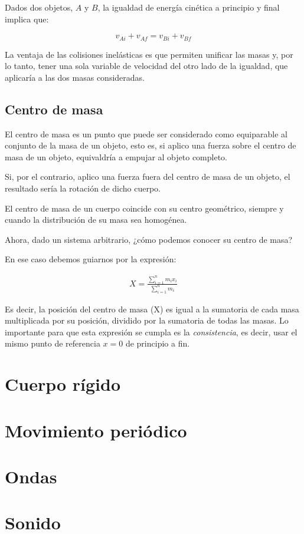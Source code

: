 \documentclass[12pt]{article}
\begin{document}
Dados dos objetos, \(A\) y \(B\), 
la igualdad de energía cinética a principio y final implica que:

\begin{equation}
	v_{Ai} + v_{Af} = v_{Bi} + v_{Bf}
\end{equation}

La ventaja de las colisiones inelásticas es que permiten unificar las masas y,
por lo tanto, tener una sola variable de velocidad del otro lado de la igualdad,
que aplicaría a las dos masas consideradas.

\subsection{Centro de masa}

El centro de masa es un punto que puede ser considerado como equiparable al 
conjunto de la masa de un objeto,
esto es,
si aplico una fuerza sobre el centro de masa de un objeto,
equivaldría a empujar al objeto completo.

Si,
por el contrario,
aplico una fuerza fuera del centro de masa de un objeto,
el resultado sería la rotación de dicho cuerpo.

El centro de masa de un cuerpo coincide con su centro geométrico,
siempre y cuando la distribución de su masa sea homogénea.

Ahora,
dado un sistema arbitrario,
¿cómo podemos conocer su centro de masa?

En ese caso debemos guiarnos por la expresión:

\begin{align*}
	X = \frac{\sum_{i=1}^{n}m_{i}x_{i}}{\sum_{i=1}^{n}m_{i}}
\end{align*}

Es decir,
la posición del centro de masa (X)
es igual a la sumatoria de cada masa multiplicada por su posición,
dividido por la sumatoria de todas las masas.
Lo importante para que esta expresión se cumpla es la \textit{consistencia},
es decir,
usar el mismo punto de referencia \(x=0\) de principio a fin.

\pagebreak

\section{Cuerpo rígido}

\pagebreak

\section{Movimiento periódico}

\pagebreak

\section{Ondas}

\pagebreak

\section{Sonido}
\end{document}
